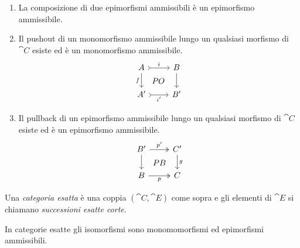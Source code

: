 \begin{definition}
\begin{enumerate}[leftmargin=*, label=(E\arabic*),
    ref=(E\arabic*)]
  \item \label{item:E1op} La composizione di due epimorfismi ammissibili
    è un epimorfismo ammissibile.
  \item \label{item:E2} Il pushout di un monomorfismo ammissibile lungo
    un qualsiasi morfismo di \(\cat C\) esiste ed è un monomorfismo
    ammissibile.
    \[
      \begin{tikzcd}
        A \ar["{f}", d, swap] \ar["{PO}" description, dr, phantom] \ar["{i}", rightarrowtail, r] & B \ar["{}", d] \\
        A' \ar["{i'}", rightarrowtail, r, swap] & B'
      \end{tikzcd}
    \]
  \item \label{item:E2op} Il pullback di un epimorfismo ammissibile
    lungo un qualsiasi morfismo di \(\cat C\) esiste ed è un epimorfismo
    ammissibile.
    \[
      \begin{tikzcd}
        B' \ar["{}", d] \ar["{PB}" description, dr, phantom] \ar["{p'}", twoheadrightarrow, r] & C' \ar["{g}", d] \\
        B \ar["{p}", twoheadrightarrow, r, swap] & C
      \end{tikzcd}
    \]
  \end{enumerate}
  Una {\em categoria esatta} è una coppia \((\cat C,\cat E)\) come sopra
  e gli elementi di \(\cat E\) si chiamano {\em successioni esatte
    corte}.
\end{definition}


\begin{proposition}
  In categorie esatte gli isomorfismi sono monomomorfismi ed epimorfismi
  ammissibili.
\end{proposition}

